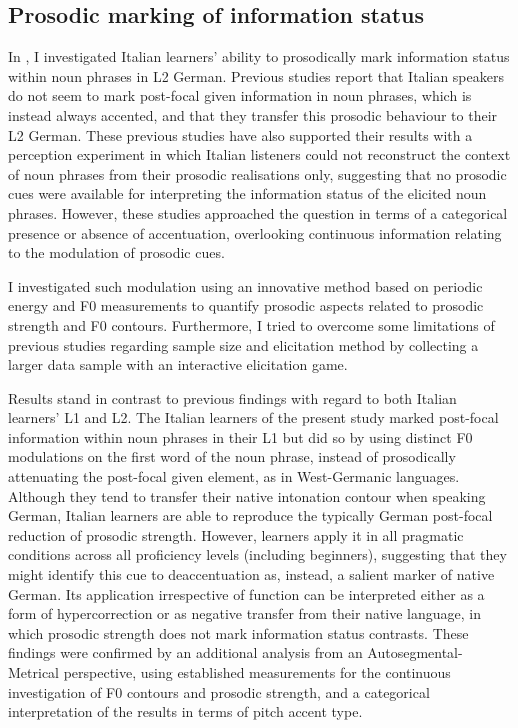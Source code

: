 \subsection{Prosodic marking of information status}
In , I investigated Italian learners’ ability to prosodically mark information status within noun phrases in L2 German. Previous studies report that Italian speakers do not seem to mark post-focal given information in noun phrases, which is instead always accented, and that they transfer this prosodic behaviour to their L2 German. These previous studies have also supported their results with a perception experiment in which Italian listeners could not reconstruct the context of noun phrases from their prosodic realisations only, suggesting that no prosodic cues were available for interpreting the information status of the elicited noun phrases. However, these studies approached the question in terms of a categorical presence or absence of accentuation, overlooking continuous information relating to the modulation of prosodic cues.

I investigated such modulation using an innovative method based on periodic energy and F0 measurements to quantify prosodic aspects related to prosodic strength and F0 contours. Furthermore, I tried to overcome some limitations of previous studies regarding sample size and elicitation method by collecting a larger data sample with an interactive elicitation game.

Results stand in contrast to previous findings with regard to both Italian learners’ L1 and L2. The Italian learners of the present study marked post-focal information within noun phrases in their L1 but did so by using distinct F0 modulations on the first word of the noun phrase, instead of prosodically attenuating the post-focal given element, as in West-Germanic languages. Although they tend to transfer their native intonation contour when speaking German, Italian learners are able to reproduce the typically German post-focal reduction of prosodic strength. However, learners apply it in all pragmatic conditions across all proficiency levels (including beginners), suggesting that they might identify this cue to deaccentuation as, instead, a salient marker of native German. Its application irrespective of function can be interpreted either as a form of hypercorrection or as negative transfer from their native language, in which prosodic strength does not mark information status contrasts. These findings were confirmed by an additional analysis from an Autosegmental-Metrical perspective, using established measurements for the continuous investigation of F0 contours and prosodic strength, and a categorical interpretation of the results in terms of pitch accent type.

